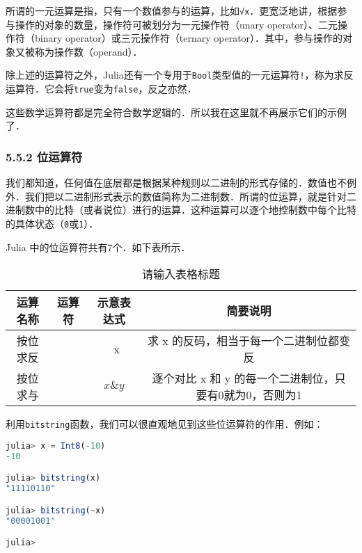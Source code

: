所谓的一元运算是指，只有一个数值参与的运算，比如\verb|√x|．更宽泛地讲，根据参与操作的对象的数量，操作符可被划分为一元操作符（unary operator）、二元操作符（binary operator）或三元操作符（ternary operator）．其中，参与操作的对象又被称为操作数（operand）．

除上述的运算符之外，Julia还有一个专用于\verb|Bool|类型值的一元运算符\verb|!|，称为求反运算符．它会将\verb|true|变为\verb|false|，反之亦然．

这些数学运算符都是完全符合数学逻辑的．所以我在这里就不再展示它们的示例了．

\subsubsection{5.5.2 位运算符}

我们都知道，任何值在底层都是根据某种规则以二进制的形式存储的．数值也不例外．我们把以二进制形式表示的数值简称为二进制数．所谓的位运算，就是针对二进制数中的比特（或者说位）进行的运算．这种运算可以逐个地控制数中每个比特的具体状态（\verb|0|或\verb|1|）．

Julia 中的位运算符共有7个．如下表所示．
\begin{table}[ht]
\centering
\caption{请输入表格标题}\label{JuC5S5_tab4}
\begin{tabular}{|c|c|c|c|}
\hline
运算名称 & 运算符 & 示意表达式 & 简要说明 \\
\hline
按位求反 & ~ & ~x & 求 x 的反码，相当于每一个二进制位都变反 \\
\hline
按位求与 & \ & $x\&y$ & 逐个对比 x 和 y 的每一个二进制位，只要有0就为0，否则为1 \\
\hline
\end{tabular}
\end{table}

利用\verb|bitstring|函数，我们可以很直观地见到这些位运算符的作用．例如：
\begin{lstlisting}[language=julia]
julia> x = Int8(-10)
-10

julia> bitstring(x)
"11110110"

julia> bitstring(~x)
"00001001"

julia> 
\end{lstlisting}

